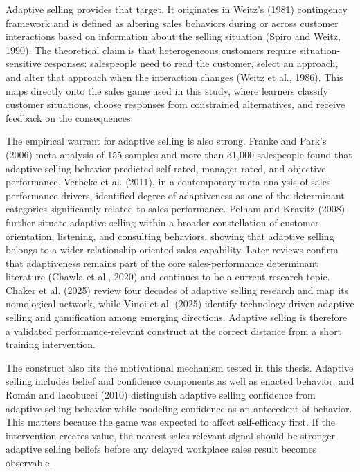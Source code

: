 \documentclass[12pt]{report}
\begin{document}
Adaptive selling provides that target. It originates in Weitz's (1981) contingency framework and is defined as altering sales behaviors during or across customer interactions based on information about the selling situation (Spiro and Weitz, 1990). The theoretical claim is that heterogeneous customers require situation-sensitive responses: salespeople need to read the customer, select an approach, and alter that approach when the interaction changes (Weitz et al., 1986). This maps directly onto the sales game used in this study, where learners classify customer situations, choose responses from constrained alternatives, and receive feedback on the consequences.

The empirical warrant for adaptive selling is also strong. Franke and Park's (2006) meta-analysis of 155 samples and more than 31{,}000 salespeople found that adaptive selling behavior predicted self-rated, manager-rated, and objective performance. Verbeke et al. (2011), in a contemporary meta-analysis of sales performance drivers, identified degree of adaptiveness as one of the determinant categories significantly related to sales performance. Pelham and Kravitz (2008) further situate adaptive selling within a broader constellation of customer orientation, listening, and consulting behaviors, showing that adaptive selling belongs to a wider relationship-oriented sales capability. Later reviews confirm that adaptiveness remains part of the core sales-performance determinant literature (Chawla et al., 2020) and continues to be a current research topic. Chaker et al. (2025) review four decades of adaptive selling research and map its nomological network, while Vinoi et al. (2025) identify technology-driven adaptive selling and gamification among emerging directions. Adaptive selling is therefore a validated performance-relevant construct at the correct distance from a short training intervention.

The construct also fits the motivational mechanism tested in this thesis. Adaptive selling includes belief and confidence components as well as enacted behavior, and Rom\'an and Iacobucci (2010) distinguish adaptive selling confidence from adaptive selling behavior while modeling confidence as an antecedent of behavior. This matters because the game was expected to affect self-efficacy first. If the intervention creates value, the nearest sales-relevant signal should be stronger adaptive selling beliefs before any delayed workplace sales result becomes observable.
\end{document}
